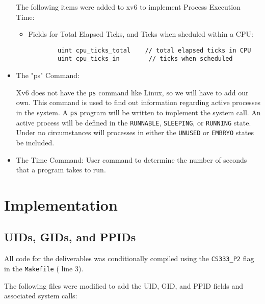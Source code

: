 \documentclass[11pt,letterpaper]{report}
\begin{document}
\begin{itemize}
	The following items were added to xv6 to implement Process Execution Time:

		\begin{itemize}
		
		\item Fields for Total Elapsed Ticks, and Ticks when sheduled within a CPU:
		\begin{verbatim}
		uint cpu_ticks_total	// total elapsed ticks in CPU
		uint cpu_ticks_in		 // ticks when scheduled
		\end{verbatim}
	
		\end{itemize}
	
	\item The "ps" Command:
	
	Xv6 does not have the {\tt ps} command like Linux, so we will have to add our own. This command is used to find out information regarding active processes in the system. A {\tt ps} program will be written to implement the system call. An active process will be defined in the {\tt RUNNABLE}, {\tt SLEEPING}, or {\tt RUNNING} state. Under no circumstances will processes in either the {\tt UNUSED} or {\tt EMBRYO} states be included.

	\item The Time Command:
	User command to determine the number of seconds that a program takes to run.
	\end{itemize}

\newpage	
	\section*{Implementation}
	
	\subsection*{UIDs, GIDs, and PPIDs}
	All code for the deliverables was conditionally compiled using the {\tt CS333\_P2} flag in the {\tt Makefile} ({\color{red} line 3}). 
	
	The following files were modified to add the UID, GID, and PPID fields and associated system calls:
	
\end{document}
